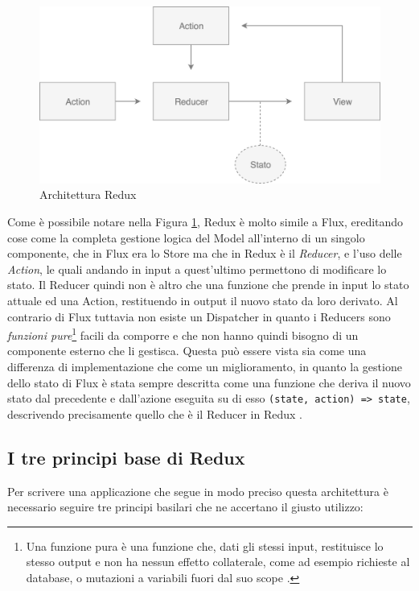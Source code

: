 \begin{figure}[h]
\centering
\vspace*{0.5cm} 
\includegraphics[width=11.5cm]{./images/ReduxWorkflow}
\caption{Architettura Redux}
\label{ReduxWorkflow}
\vspace*{0.5cm} 
\end{figure}

\noindent
Come è possibile notare nella Figura \ref{ReduxWorkflow}, Redux è molto simile a Flux, ereditando cose come la completa gestione logica del Model all'interno di un singolo componente, che in Flux era lo Store ma che in Redux è il \textit{Reducer}, e l'uso delle \textit{Action}, le quali andando in input a quest'ultimo permettono di modificare lo stato. Il Reducer quindi non è altro che una funzione che prende in input lo stato attuale ed una Action, restituendo in output il nuovo stato da loro derivato.
Al contrario di Flux tuttavia non esiste un Dispatcher in quanto i Reducers sono \textit{funzioni pure}\footnote{Una funzione pura è una funzione che, dati gli stessi input, restituisce lo stesso output e non ha nessun effetto collaterale, come ad esempio richieste al database, o mutazioni a variabili fuori dal suo scope \cite{FranklinOnPureFunctions}.} facili da comporre e che non hanno quindi bisogno di un componente esterno che li gestisca. Questa può essere vista sia come una differenza di implementazione che come un miglioramento, in quanto la gestione dello stato di Flux è stata sempre descritta come una funzione che deriva il nuovo stato dal precedente e dall'azione eseguita su di esso \texttt{(state, action) => state}, descrivendo precisamente quello che è il Reducer in Redux \cite{ReduxPriorArt}.

\subsection{I tre principi base di Redux}
Per scrivere una applicazione che segue in modo preciso questa architettura è necessario seguire tre principi basilari che ne accertano il giusto utilizzo:

